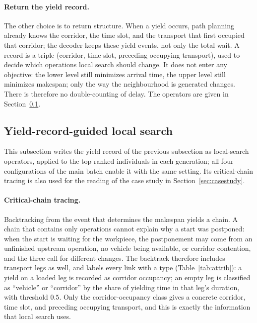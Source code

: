 \documentclass[manuscript,screen,review]{acmart}
\begin{document}
\paragraph{Return the yield record.}
The other choice is to return structure. When a yield occurs, path planning already knows the corridor, the time slot, and the transport that first occupied that corridor; the decoder keeps these yield events, not only the total wait.
A record is a triple (corridor, time slot, preceding occupying transport), used to decide which operations local search should change.
It does not enter any objective: the lower level still minimizes arrival time, the upper level still minimizes makespan; only the way the neighbourhood is generated changes.
There is therefore no double-counting of delay. The operators are given in Section~\ref{sec:ls}.

\subsection{Yield-record-guided local search}
\label{sec:ls}
This subsection writes the yield record of the previous subsection as local-search operators, applied to the top-ranked individuals in each generation; all four configurations of the main batch enable it with the same setting. Its critical-chain tracing is also used for the reading of the case study in Section~\ref{sec:casestudy}.

\paragraph{Critical-chain tracing.}
Backtracking from the event that determines the makespan yields a chain. A chain that contains only operations cannot explain why a start was postponed: when the start is waiting for the workpiece, the postponement may come from an unfinished upstream operation, no vehicle being available, or corridor contention, and the three call for different changes.
The backtrack therefore includes transport legs as well, and labels every link with a type (Table~\ref{tab:attrib}): a yield on a loaded leg is recorded as corridor occupancy; an empty leg is classified as ``vehicle'' or ``corridor'' by the share of yielding time in that leg's duration, with threshold $0.5$.
Only the corridor-occupancy class gives a concrete corridor, time slot, and preceding occupying transport, and this is exactly the information that local search uses.
\end{document}
